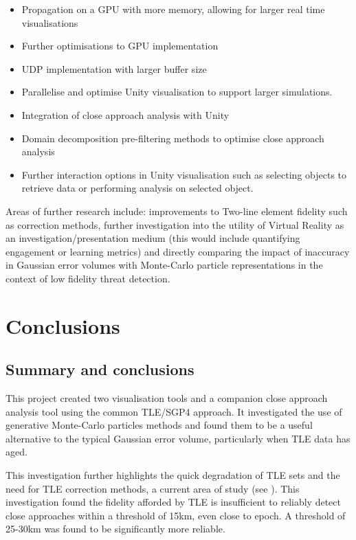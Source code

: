 \documentclass[12pt,openany,a4paper]{book}
\begin{document}
	\begin{itemize}
		\item Propagation on a GPU with more memory, allowing for larger real time visualisations
		\item Further optimisations to GPU implementation
		\item UDP implementation with larger buffer size
		\item Parallelise and optimise Unity visualisation to support larger simulations.
		\item Integration of close approach analysis with Unity
		\item Domain decomposition pre-filtering methods to optimise close approach analysis
		\item Further interaction options in Unity visualisation such as selecting objects to retrieve data or performing analysis on selected object.
	\end{itemize}
	
	Areas of further research include: improvements to Two-line element fidelity such as correction methods, further investigation into the utility of Virtual Reality as an investigation/presentation medium (this would include quantifying engagement or learning metrics) and directly comparing the impact of inaccuracy in Gaussian error volumes with Monte-Carlo particle representations in the context of low fidelity threat detection.


	\chapter{Conclusions}
	

	\section{Summary and conclusions}
	
	This project created two visualisation tools and a companion close approach analysis tool using the common TLE/SGP4 approach. It investigated the use of generative Monte-Carlo particles methods and found them to be a useful alternative to the typical Gaussian error volume, particularly when TLE data has aged. \newline 
	
	This investigation further highlights the quick degradation of TLE sets and the need for TLE correction methods, a current area of study (see \cite{tleBIAS, tleCorr}). This investigation found the fidelity afforded by TLE is insufficient to reliably detect close approaches within a threshold of 15km, even close to epoch. A threshold of 25-30km was found to be significantly more reliable. \newline
	
\end{document}

